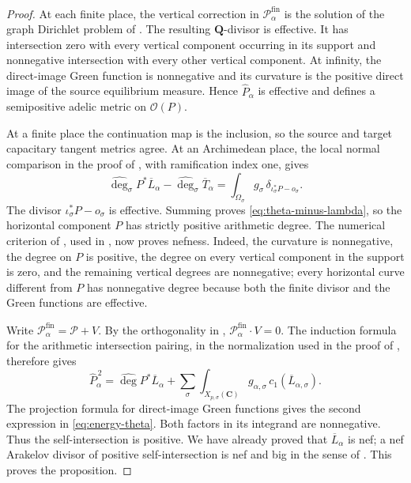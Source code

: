 \documentclass[11pt]{article}
\theoremstyle{definition}
\theoremstyle{remark}
\newcommand{\Q}{\mathbf Q}
\newcommand{\C}{\mathbf C}
\newcommand{\widehatdeg}{\widehat{\deg}}
\begin{document}
\begin{proof}
At each finite place, the vertical correction in
$\mathscr P_\alpha^{\mathrm{fin}}$ is the solution of the graph Dirichlet
problem of \cite[Proposition~5.1]{BostChambertLoir2009}.  The resulting
$\Q$-divisor is effective.  It has intersection zero with every vertical
component occurring in its support and nonnegative intersection with every
other vertical component.  At infinity, the direct-image Green function is
nonnegative and its curvature is the positive direct image of the source
equilibrium measure.  Hence $\widehat P_\alpha$ is effective and defines a
semipositive adelic metric on $\mathcal O(P)$.

At a finite place the continuation map is the inclusion, so the source and
target capacitary tangent metrics agree.  At an Archimedean place, the local
normal comparison in the proof of
\cite[Lemma~7.2.7 and Proposition~7.2.10]{BostCharles2022}, with ramification
index one, gives
\[
 \widehatdeg_\sigma P^*\overline L_\alpha
 -\widehatdeg_\sigma\overline T_\alpha
 =\int_{\Omega_\sigma}g_\sigma\,
   \delta_{\iota_\sigma^*P-o_\sigma}.
\]
The divisor $\iota_\sigma^*P-o_\sigma$ is effective.  Summing proves
\eqref{eq:theta-minus-lambda}, so the horizontal component $P$ has strictly
positive arithmetic degree.  The numerical criterion of
\cite[Proposition~6.9]{Bost1999}, used in
\cite[Proposition~7.7]{BostChambertLoir2009}, now proves nefness.  Indeed, the
curvature is nonnegative, the degree on $P$ is positive, the degree on every
vertical component in the support is zero, and the remaining vertical degrees
are nonnegative; every horizontal curve different from $P$ has nonnegative
degree because both the finite divisor and the Green functions are
effective.

Write $\mathscr P_\alpha^{\mathrm{fin}}=\mathscr P+V$.  By the orthogonality
in \cite[Proposition~5.1]{BostChambertLoir2009},
$\mathscr P_\alpha^{\mathrm{fin}}\cdot V=0$.  The induction formula for
the arithmetic intersection pairing, in the normalization used in the proof
of \cite[Proposition~7.2.6]{BostCharles2022}, therefore gives
\[
 \widehat P_\alpha^{\,2}
 =\widehatdeg P^*\overline L_\alpha
  +\sum_\sigma\int_{X_{p,\sigma}(\C)}
    g_{\alpha,\sigma}\,c_1(\overline L_{\alpha,\sigma}).
\]
The projection formula for direct-image Green functions gives the second
expression in \eqref{eq:energy-theta}.  Both factors in its integrand are
nonnegative.  Thus the self-intersection is positive.  We have already proved
that $\overline L_\alpha$ is nef; a nef Arakelov divisor of positive
self-intersection is nef and big in the sense of
\cite[Section~8.2.2]{BostCharles2022}.  This proves the proposition.
\end{proof}
\end{document}
